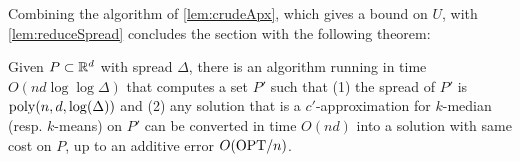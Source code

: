 
Combining the algorithm of \cref{lem:crudeApx}, which gives a bound on $U$, with \cref{lem:reduceSpread} concludes the section with the following theorem:

\begin{theorem}
Given $P \subset \mathbb{R}^d$ with spread $\Delta$, there is an algorithm running in time $O(nd \log \log \Delta)$ that computes a set $P'$ such that (1) the spread of $P'$ is $\operatorname{poly}(n,d, \log(\Delta))$ and (2) any solution that is a $c'$-approximation for  $k$-median (resp. $k$-means) on $P'$ can be converted in time $O(nd)$ into a solution with same cost on $P$, up to an additive error $O(\text{OPT} / n)$.
\end{theorem}
